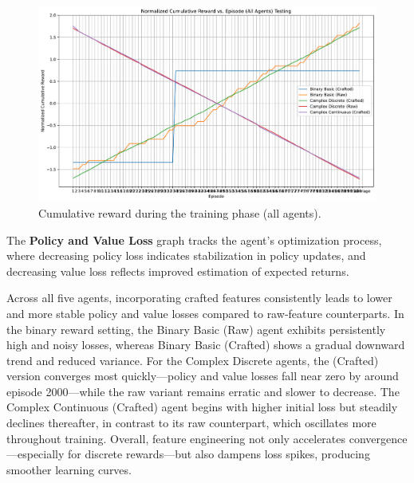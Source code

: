 \documentclass[sigconf]{acmart}
\begin{document}
\bigskip

\begin{figure}[t]
  \centering
  \includegraphics[width=\textwidth]{cumulative_reward_all_testing.pdf}
  \caption{Cumulative reward during the training phase (all agents).}
  \label{fig:cumulative_reward_all_testing}
\end{figure}

The \textbf{Policy and Value Loss} graph tracks the agent's optimization process, where decreasing policy loss indicates stabilization in policy updates, and decreasing value loss reflects improved estimation of expected returns. 

\bigskip

Across all five agents, incorporating crafted features consistently leads to lower and more stable policy and value losses compared to raw‐feature counterparts. In the binary reward setting, the Binary Basic (Raw) agent exhibits persistently high and noisy losses, whereas Binary Basic (Crafted) shows a gradual downward trend and reduced variance. For the Complex Discrete agents, the (Crafted) version converges most quickly—policy and value losses fall near zero by around episode 2000—while the raw variant remains erratic and slower to decrease. The Complex Continuous (Crafted) agent begins with higher initial loss but steadily declines thereafter, in contrast to its raw counterpart, which oscillates more throughout training. Overall, feature engineering not only accelerates convergence—especially for discrete rewards—but also dampens loss spikes, producing smoother learning curves.

\bigskip
\end{document}
